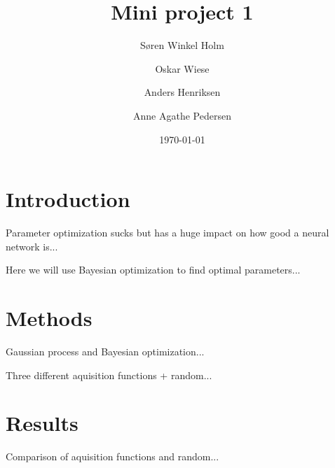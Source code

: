 \documentclass[12pt,fleqn,]{article}
\title{Mini project 1}
\author{Søren Winkel Holm\and Oskar Wiese\and Anders Henriksen\and Anne Agathe Pedersen}
\date{\today}
\begin{document}
\maketitle

\tableofcontents


\section{Introduction}
Parameter optimization sucks but has a huge impact on how good a neural network is...

Here we will use Bayesian optimization to find optimal parameters...


\section{Methods}
Gaussian process and Bayesian optimization...

Three different aquisition functions + random...


\section{Results}
Comparison of aquisition functions and random...
\end{document}
